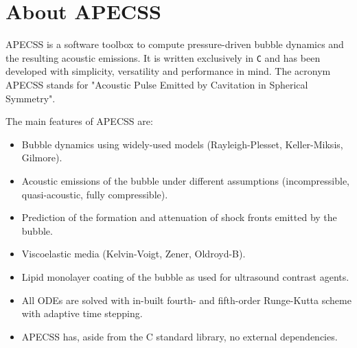 \chapter{About APECSS}

APECSS is a software toolbox to compute pressure-driven bubble dynamics and the resulting acoustic emissions. It is written exclusively in {\tt C} and has been developed with simplicity, versatility and performance in mind. The acronym APECSS stands for "Acoustic Pulse Emitted by Cavitation in Spherical Symmetry".

The main features of APECSS are:\vspace{-1em}
\begin{itemize}[noitemsep]
\item Bubble dynamics using widely-used models (Rayleigh-Plesset, Keller-Miksis, Gilmore).
\item Acoustic emissions of the bubble under different assumptions (incompressible, quasi-acoustic, fully compressible).
\item Prediction of the formation and attenuation of shock fronts emitted by the bubble.
\item Viscoelastic media (Kelvin-Voigt, Zener, Oldroyd-B).
\item Lipid monolayer coating of the bubble as used for ultrasound contrast agents.
\item All ODEs are solved with in-built fourth- and fifth-order Runge-Kutta scheme with adaptive time stepping.
\item APECSS has, aside from the C standard library, no external dependencies.
\end{itemize}

